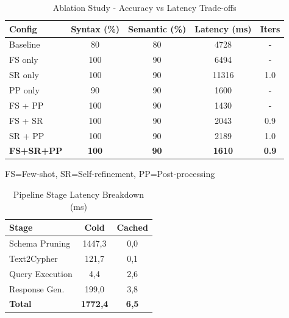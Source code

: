 \documentclass[sigconf]{acmart}
\begin{document}
\begin{table}
  \caption{Ablation Study - Accuracy vs Latency Trade-offs}
  \label{tab:ablation}
  \begin{tabular}{lcccc}
    \toprule
    Config            & Syntax (\%)  & Semantic (\%) & Latency (ms)  & Iters        \\
    \midrule
    Baseline          & 80           & 80            & 4728          & -            \\
    FS only           & 100          & 90            & 6494          & -            \\
    SR only           & 100          & 90            & 11316         & 1.0          \\
    PP only           & 90           & 90            & 1600          & -            \\
    FS + PP           & 100          & 90            & 1430          & -            \\
    FS + SR           & 100          & 90            & 2043          & 0.9          \\
    SR + PP           & 100          & 90            & 2189          & 1.0          \\
    \textbf{FS+SR+PP} & \textbf{100} & \textbf{90}   & \textbf{1610} & \textbf{0.9} \\
    \bottomrule
  \end{tabular}
  \vspace{2mm}
  {\footnotesize FS=Few-shot, SR=Self-refinement, PP=Post-processing}
\end{table}

\begin{table}
  \caption{Pipeline Stage Latency Breakdown (ms)}
  \label{tab:latency}
  \begin{tabular}{lcc}
    \toprule
    Stage           & Cold            & Cached       \\
    \midrule
    Schema Pruning  & 1447,3          & 0,0          \\
    Text2Cypher     & 121,7           & 0,1          \\
    Query Execution & 4,4             & 2,6          \\
    Response Gen.   & 199,0           & 3,8          \\
    \textbf{Total}  & \textbf{1772,4} & \textbf{6,5} \\
    \bottomrule
  \end{tabular}
\end{table}
\end{document}
